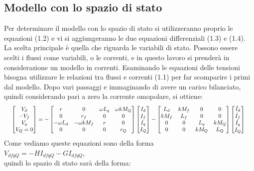 \documentclass[Lau,noexaminfo]{sapthesis}
\begin{document}
	\subsection{Modello con lo spazio di stato}Per determinare il modello con lo spazio di stato si utilizzeranno proprio le equazioni (1.2) e vi si aggiungeranno le due equazioni differenziali (1.3) e (1.4). La scelta principale è quella che riguarda le variabili di stato. Possono essere scelti i flussi come variabili, o le correnti, e in questo lavoro si prenderà in considerazione un modello in correnti. Esaminando le equazioni delle tensioni bisogna utilizzare le relazioni tra flussi e correnti (1.1) per far scomparire i primi dal modello. Dopo vari passaggi e immaginando di avere un carico bilanciato, quindi considerando pari a zero la corrente omopolare, si ottiene:
	\begin{equation*}
	\resizebox{0.98\hsize}{!}{%
		$\begin{bmatrix}
		V_d \\
		-V_f \\
		V_q \\
		V_Q=0
		\end{bmatrix}=
		-\begin{bmatrix}
		r & 0 & \omega L_q & \omega kM_Q \\
		0 & r_f & 0 & 0\\
		-\omega L_d & -\omega kM_f & r & 0\\
		0 & 0 & 0 & r_Q
		\end{bmatrix}
		\begin{bmatrix}
		I_d\\
		I_f\\
		I_q\\
		I_Q
		\end{bmatrix}
		-\begin{bmatrix}
		L_d & kM_f & 0 & 0\\
		kM_f & L_f & 0 & 0\\
		0 & 0 & L_q &  kM_Q\\
		0 & 0 & kM_Q & L_Q
		\end{bmatrix} \begin{bmatrix}
		\dot{I}_d\\
		\dot{I}_f\\
		\dot{I}_q\\
		\dot{I}_Q
		\end{bmatrix} $
	}
	\end{equation*}
	Come vediamo queste equazioni sono della forma\\
	$V_{dfqQ}=-H I_{dfqQ} - G \dot{I}_{dfqQ}$, \\quindi lo spazio di stato sarà della forma:\\
\end{document}
